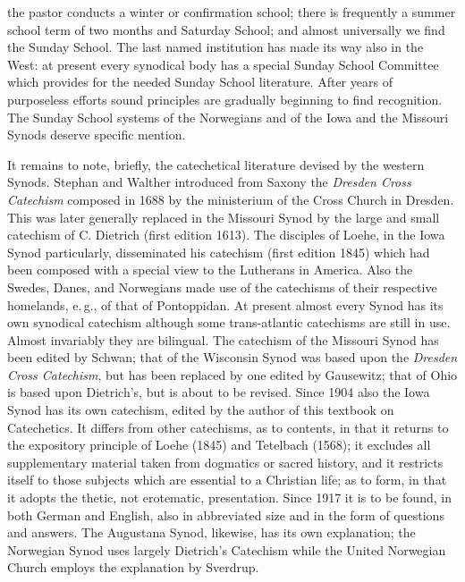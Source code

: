 the pastor conducts a winter or confirmation school; there is frequently a summer school term of two months and Saturday School; and almost universally we find the Sunday School. The last named institution has made its way also in the West: at present every synodical body has a special Sunday School Committee which provides for the needed Sunday School literature. After years of purposeless efforts sound principles are gradually beginning to find recognition. The Sunday School systems of the Norwegians and of the Iowa and the Missouri Synods deserve specific mention.

It remains to note, briefly, the catechetical literature devised by the western Synods. Stephan and Walther introduced from Saxony the \emph{Dresden Cross Catechism} composed in 1688 by the ministerium of the Cross Church in Dresden. This was later generally replaced in the Missouri Synod by the large and small catechism of C. Dietrich (first edition 1613). The disciples of Loehe, in the Iowa Synod particularly, disseminated his catechism (first edition 1845) which had been composed with a special view to the Lutherans in America. Also the Swedes, Danes, and Norwegians made use of the catechisms of their respective homelands, e.\,g., of that of Pontoppidan. At present almost every Synod has its own synodical catechism although some trans-atlantic catechisms are still in use. Almost invariably they are bilingual. The catechism of the Missouri Synod has been edited by Schwan; that of the Wisconsin Synod was based upon the \emph{Dresden Cross Catechism}, but has been replaced by one edited by Gausewitz; that of Ohio is based upon Dietrich’s, but is about to be revised. Since 1904 also the Iowa Synod has its own catechism, edited by the author of this textbook on Catechetics. It differs from other catechisms, as to contents, in that it returns to the expository principle of Loehe (1845) and Tetelbach (1568); it excludes all supplementary material taken from dogmatics or sacred history, and it restricts
itself to those subjects which are essential to a Christian life; as to form, in that it adopts the thetic, not erotematic, presentation. Since 1917 it is to be found, in both German and English, also in abbreviated size and in the form of questions and answers. The Augustana Synod, likewise, has its own explanation; the Norwegian Synod uses largely Dietrich’s Catechism while the United Norwegian Church employs the explanation by Sverdrup.

